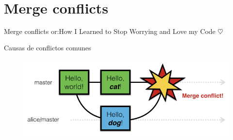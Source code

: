 \documentclass[10pt]{beamer}
\begin{document}
\section{Merge conflicts}

\begin{frame}{Merge conflicts or:}{How I Learned to Stop Worrying and Love my Code $\heartsuit$}

\begin{block}{Causas de conflictos comunes}

\begin{figure}[h!]
\centering
\includegraphics [scale=0.6]{step2}
\label{fig:issues}
\end{figure}
    
\end{block}
\end{frame}

\end{document}

